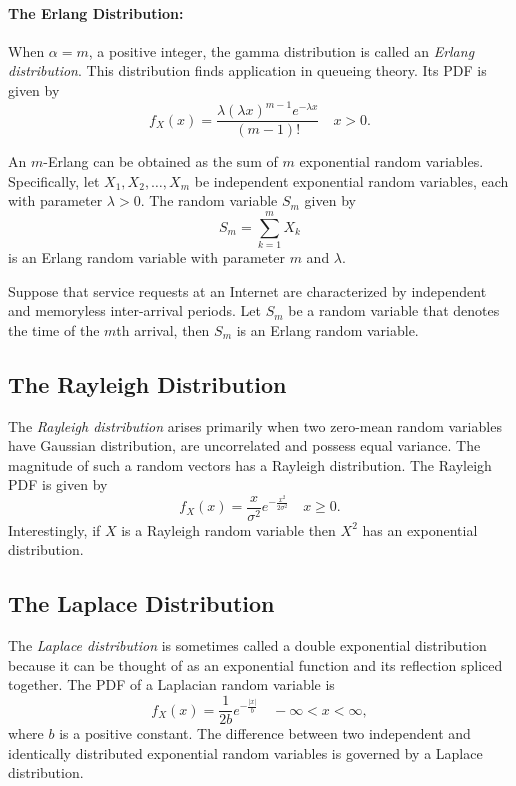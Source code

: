\paragraph{The Erlang Distribution:}
When $\alpha = m$, a positive integer, the gamma distribution is called an \emph{Erlang distribution}.
This distribution finds application in queueing theory.
Its PDF is given by
\begin{equation*}
f_X (x) = \frac{\lambda (\lambda x)^{m - 1} e^{-\lambda x}}{(m-1)!} \quad  x > 0.
\end{equation*}

An $m$-Erlang can be obtained as the sum of $m$ exponential random variables.
Specifically, let $X_1, X_2, \ldots, X_m$ be independent exponential random variables, each with parameter $\lambda > 0$.
The random variable $S_m$ given by
\begin{equation*}
S_m = \sum_{k=1}^m X_k
\end{equation*}
is an Erlang random variable with parameter $m$ and $\lambda$.

\begin{example}
Suppose that service requests at an Internet are characterized by independent and memoryless inter-arrival periods.
Let $S_m$ be a random variable that denotes the time of the $m$th arrival, then $S_m$ is an Erlang  random variable.
\end{example}


\subsection{The Rayleigh Distribution}

The \emph{Rayleigh distribution} arises primarily when two zero-mean random variables have Gaussian distribution, are uncorrelated and possess equal variance. 
The magnitude of such a random vectors has a Rayleigh distribution.
The Rayleigh PDF is given by
\begin{equation*}
f_X (x) = \frac{x}{\sigma^2} e^{- \frac{x^2}{2 \sigma^2} } \quad x \geq 0 .
\end{equation*}
Interestingly, if $X$ is a Rayleigh random variable then $X^2$ has an exponential distribution.


\subsection{The Laplace Distribution}
The \emph{Laplace distribution} is sometimes called a double exponential distribution because it can be thought of as an exponential function and its reflection spliced together. 
The PDF of a Laplacian random variable is
\begin{equation*}
f_X (x) = \frac{1}{2b} e^{- \frac{|x|}{b}} \quad - \infty < x < \infty,
\end{equation*}
where $b$ is a positive constant.
The difference between two independent and identically distributed exponential random variables is governed by a Laplace distribution.


